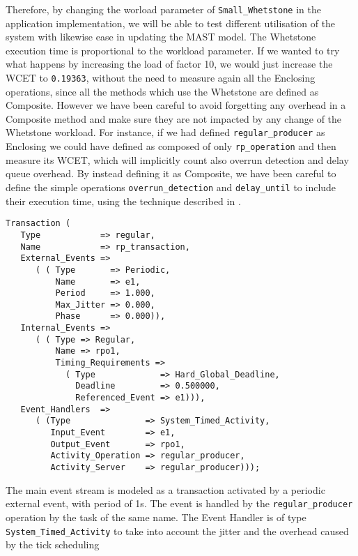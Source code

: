 \documentclass{article}
\begin{document}
Therefore, by changing the worload parameter of \texttt{Small\_Whetstone} in the application implementation, we will be able to test different utilisation of the system with likewise ease in updating the MAST model. The Whetstone execution time is proportional to the workload parameter. If we wanted to try what happens by increasing the load of factor 10, we would just increase the WCET to \texttt{0.19363}, without the need to measure again all the Enclosing operations, since all the methods which use the Whetstone are defined as Composite. However we have been careful to avoid forgetting any overhead in a Composite method and make sure they are not impacted by any change of the Whetstone workload. For instance, if we had defined \texttt{regular\_producer} as Enclosing we could have defined as composed of only \texttt{rp\_operation} and then measure its WCET, which will implicitly count also overrun detection and delay queue overhead. By instead defining it as Composite, we have been careful to define the simple operations \texttt{overrun\_detection} and \texttt{delay\_until} to include their execution time, using the technique described in \cite{effects-runtime}.

\begin{lstlisting}
Transaction (
   Type            => regular,
   Name            => rp_transaction,
   External_Events =>
      ( ( Type       => Periodic,
          Name       => e1,
          Period     => 1.000,
          Max_Jitter => 0.000,
          Phase      => 0.000)),
   Internal_Events =>
      ( ( Type => Regular,
          Name => rpo1,
          Timing_Requirements =>
            ( Type             => Hard_Global_Deadline,
              Deadline         => 0.500000,
              Referenced_Event => e1))),
   Event_Handlers  =>
      ( (Type               => System_Timed_Activity,
         Input_Event        => e1,
         Output_Event       => rpo1,
         Activity_Operation => regular_producer,
         Activity_Server    => regular_producer)));
\end{lstlisting}

The main event stream is modeled as a transaction activated by a periodic external event, with period of 1s. The event is handled by the \texttt{regular\_producer} operation by the task of the same name. The Event Handler is of type \texttt{System\_Timed\_Activity} to take into account the jitter and the overhead caused by the tick scheduling
\end{document}
